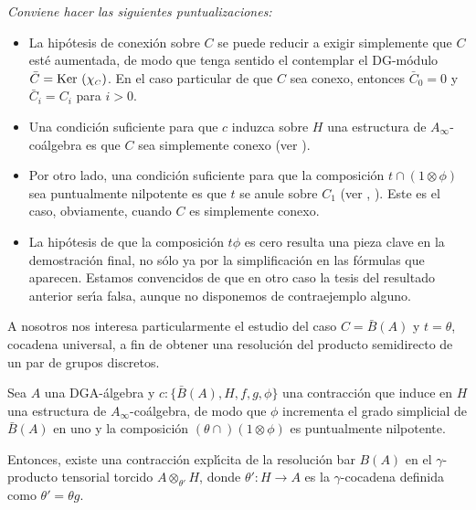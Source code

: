 \begin{rmk} {\em Conviene hacer las siguientes puntualizaciones:
\begin{itemize}
\item La hip\'{o}tesis de conexi\'{o}n sobre $C$ se puede reducir
a exigir simplemente que $C$ est\'{e} aumentada, de modo que tenga
sentido el contemplar el DG-m\'{o}dulo $\bar{C}=\mbox{Ker }(\chi
_{\scriptscriptstyle C})$. En el caso particular de que $C$ sea conexo, entonces
$\bar{C}_0=0$ y $\bar{C}_i=C_i$ para $i>0$.

\item Una condici\'{o}n suficiente para que $c$ induzca
sobre $H$ una estructura de $A_{\infty}$-co\'{a}lgebra es que $C$
sea simplemente conexo (ver \cite{GS86}).

\item Por otro lado, una condici\'{o}n suficiente para que la
composici\'{o}n $t \cap (1 \otimes \phi )$ sea puntualmente
nilpotente es que $t$ se anule sobre $C_1$ (ver \cite{May67},
\cite{LS87}). Este es el caso, obviamente, cuando $C$ es
simplemente conexo.

\item La hip\'{o}tesis de que la composici\'{o}n $t \phi$ es cero
resulta una pieza clave en la demostraci\'{o}n final, no s\'{o}lo ya
por la simplificaci\'{o}n en las f\'{o}rmulas que aparecen. Estamos
convencidos de que en otro caso la tesis del resultado anterior
ser\'{\i}a falsa, aunque no disponemos de contraejemplo alguno.
\end{itemize}}
\end{rmk}

A nosotros nos interesa particularmente el estudio del caso $C=
\bar{B}(A)$ y $t= \theta$, cocadena universal, a fin de obtener
una resoluci\'{o}n del producto semidirecto de un par de grupos
discretos.

\begin{thr}
Sea $A$ una DGA-\'{a}lgebra y $c: \{ \bar{B}(A), H, f, g ,\phi\}$
una contracci\'{o}n que induce en $H$ una estructura de
$A_{\infty}$-co\'{a}lgebra, de modo que $\phi$ incrementa el grado
simplicial de $\bar{B}(A)$ en uno y la composici\'{o}n $(\theta
\cap) (1 \otimes \phi)$ es puntualmente nilpotente.

Entonces, existe una contracci\'{o}n expl\'{\i}cita de la
resoluci\'{o}n bar $B(A)$ en el $\gamma$-producto tensorial
torcido $A \otimes _{\theta '} H$, donde $\theta ':H \rightarrow
A$ es la $\gamma$-cocadena definida como $\theta '=\theta g$.
\end{thr}

